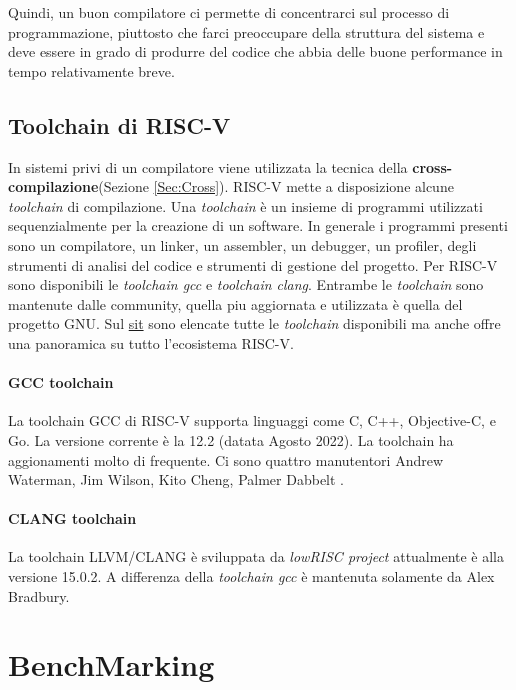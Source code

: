 \documentclass[12pt, a4paper]{report}
\begin{document}
Quindi, un buon compilatore ci permette di concentrarci sul processo di programmazione, piuttosto che farci preoccupare della struttura del sistema e deve essere in grado di produrre del codice che abbia delle buone performance in tempo relativamente breve.


\section{Toolchain di RISC-V}
In sistemi privi di un compilatore viene utilizzata la tecnica della \textbf{cross-compilazione}(Sezione \ref{Sec:Cross}). RISC-V mette a disposizione alcune \textit{toolchain} di compilazione. Una \textit{toolchain} è un insieme di programmi utilizzati sequenzialmente per la creazione di un software. In generale i programmi presenti sono un compilatore, un linker, un assembler, un debugger, un profiler, degli strumenti di analisi del codice e strumenti di gestione del progetto. Per RISC-V sono disponibili le \textit{toolchain gcc}\cite{toolchain_gcc} e \textit{toolchain clang}\cite{toolchain_clang}. Entrambe le \textit{toolchain} sono mantenute dalle community, quella piu aggiornata e utilizzata è quella del progetto GNU. Sul \href{https://wiki.riscv.org/display/HOME/RISC-V+Software+Ecosystem}{sit} sono elencate tutte le \textit{toolchain} disponibili ma anche offre una panoramica su tutto l'ecosistema RISC-V.


\subsubsection{GCC toolchain}
La toolchain GCC di RISC-V supporta linguaggi come C, C++, Objective-C, e Go. La versione corrente è la 12.2 (datata Agosto 2022). La toolchain ha aggionamenti molto di frequente. Ci sono quattro manutentori Andrew Waterman, Jim Wilson, Kito Cheng, Palmer Dabbelt .

\subsubsection{CLANG toolchain}
La toolchain LLVM/CLANG è sviluppata da \textit{lowRISC project} attualmente è alla versione 15.0.2. A differenza della \textit{toolchain gcc} è mantenuta solamente da Alex Bradbury.



\chapter{BenchMarking}
\end{document}
